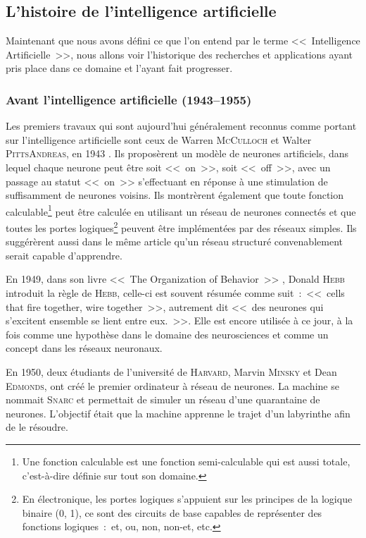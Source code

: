 \subsection{L'histoire de l'intelligence artificielle}

Maintenant que nous avons défini ce que l'on entend par le terme <<~Intelligence Artificielle~>>, nous allons voir l'historique des recherches et applications ayant pris place dans ce domaine et l'ayant fait progresser.

\subsubsection{Avant l'intelligence artificielle (1943–1955)}

Les premiers travaux qui sont aujourd'hui généralement reconnus comme portant sur l'intelligence artificielle sont ceux de Warren \textsc{McCulloch} et Walter \textsc{PittsAndreas}, en 1943 \cite{W_and_W}.
Ils proposèrent un modèle de neurones artificiels, dans lequel chaque neurone peut être soit <<~on~>>, soit <<~off~>>, avec un passage au statut <<~on~>> s'effectuant en réponse à une stimulation de suffisamment de neurones voisins.
Ils montrèrent également que toute fonction calculable\footnote{Une fonction calculable est une fonction semi-calculable qui est aussi totale, c'est-à-dire définie sur tout son domaine.} peut être calculée en utilisant un réseau de neurones connectés et que toutes les portes logiques\footnote{En électronique, les portes logiques s'appuient sur les principes de la logique binaire (0, 1), ce sont des circuits de base capables de représenter des fonctions logiques~:~et, ou, non, non-et, etc.} peuvent être implémentées par des réseaux simples.
Ils suggérèrent aussi dans le même article qu'un réseau structuré convenablement serait capable d'apprendre.

En 1949, dans son livre <<~The Organization of Behavior~>> \cite{hebb}, Donald \textsc{Hebb} introduit la règle de \textsc{Hebb}, celle-ci est souvent résumée comme suit~:~<<~cells that fire together, wire together~>>, autrement dit <<~des neurones qui s'excitent ensemble se lient entre eux.~>>.
Elle est encore utilisée à ce jour, à la fois comme une hypothèse dans le domaine des neurosciences et comme un concept dans les réseaux neuronaux.

En 1950, deux étudiants de l'université de \textsc{Harvard}, Marvin \textsc{Minsky} et Dean \textsc{Edmonds}, ont créé le premier ordinateur à réseau de neurones.
La machine se nommait \textsc{Snarc} et permettait de simuler un réseau d'une quarantaine de neurones.
L'objectif était que la machine apprenne le trajet d'un labyrinthe afin de le résoudre.

